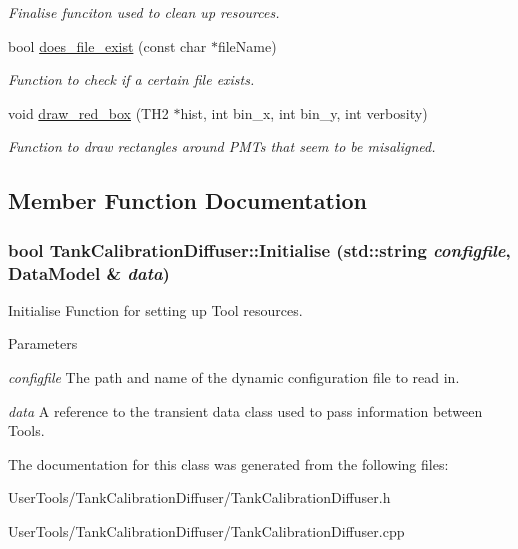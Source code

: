 \begin{DoxyCompactItemize}
\begin{DoxyCompactList}\small\item\em Finalise funciton used to clean up resources. \item\end{DoxyCompactList}\item 
\hypertarget{classTankCalibrationDiffuser_a8f563cd1027d7632f5e61688ede35bd1}{
bool \hyperlink{classTankCalibrationDiffuser_a8f563cd1027d7632f5e61688ede35bd1}{does\_\-file\_\-exist} (const char $\ast$fileName)}
\label{classTankCalibrationDiffuser_a8f563cd1027d7632f5e61688ede35bd1}

\begin{DoxyCompactList}\small\item\em Function to check if a certain file exists. \item\end{DoxyCompactList}\item 
\hypertarget{classTankCalibrationDiffuser_a3b25eb8574a9c9146bab698c71edb573}{
void \hyperlink{classTankCalibrationDiffuser_a3b25eb8574a9c9146bab698c71edb573}{draw\_\-red\_\-box} (TH2 $\ast$hist, int bin\_\-x, int bin\_\-y, int verbosity)}
\label{classTankCalibrationDiffuser_a3b25eb8574a9c9146bab698c71edb573}

\begin{DoxyCompactList}\small\item\em Function to draw rectangles around PMTs that seem to be misaligned. \item\end{DoxyCompactList}\end{DoxyCompactItemize}


\subsection{Member Function Documentation}
\hypertarget{classTankCalibrationDiffuser_a7238278dec1744e7ff2b9d429646d5a0}{
\subsubsection[{Initialise}]{\setlength{\rightskip}{0pt plus 5cm}bool TankCalibrationDiffuser::Initialise (std::string {\em configfile}, \/  {\bf DataModel} \& {\em data})}}
\label{classTankCalibrationDiffuser_a7238278dec1744e7ff2b9d429646d5a0}


Initialise Function for setting up Tool resources. 
\begin{DoxyParams}{Parameters}
\item[{\em configfile}]The path and name of the dynamic configuration file to read in. \item[{\em data}]A reference to the transient data class used to pass information between Tools. \end{DoxyParams}


The documentation for this class was generated from the following files:\begin{DoxyCompactItemize}
\item 
UserTools/TankCalibrationDiffuser/TankCalibrationDiffuser.h\item 
UserTools/TankCalibrationDiffuser/TankCalibrationDiffuser.cpp\end{DoxyCompactItemize}

